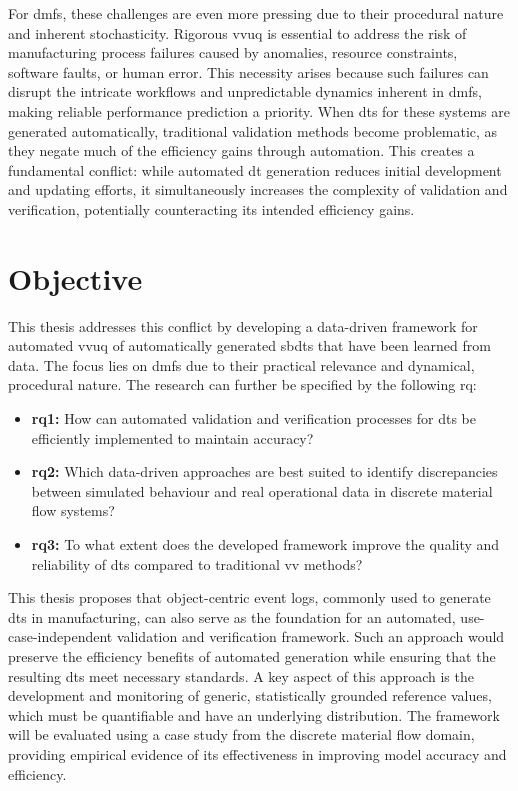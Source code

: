 For \gls{dmfs}, these challenges are even more pressing due to their procedural nature and inherent stochasticity. Rigorous \gls{vvuq} is essential to address the risk of manufacturing process failures caused by anomalies, resource constraints, software faults, or human error. This necessity arises because such failures can disrupt the intricate workflows and unpredictable dynamics inherent in \gls{dmfs}, making reliable performance prediction a priority. When \gls{dt}s for these systems are generated automatically, traditional validation methods become problematic, as they negate much of the efficiency gains through automation. This creates a fundamental conflict: while automated \gls{dt} generation reduces initial development and updating efforts, it simultaneously increases the complexity of validation and verification, potentially counteracting its intended efficiency gains.

\section{Objective}

This thesis addresses this conflict by developing a data-driven framework for automated \gls{vvuq} of automatically generated \gls{sbdt}s that have been learned from data. The focus lies on \gls{dmfs} due to their practical relevance and dynamical, procedural nature. The research can further be specified by the following \gls{rq}:

\begin{itemize}
  \label{par:rq1}
  \item \textbf{\gls{rq}1:} How can automated validation and verification processes for \gls{dt}s be efficiently implemented to maintain accuracy?
        \label{par:rq2}
  \item \textbf{\gls{rq}2:} Which data-driven approaches are best suited to identify discrepancies between simulated behaviour and real operational data in discrete material flow systems?
        \label{par:rq3}
  \item \textbf{\gls{rq}3:} To what extent does the developed framework improve the quality and reliability of \gls{dt}s compared to traditional \gls{vv} methods?
\end{itemize}

This thesis proposes that object-centric event logs, commonly used to generate \gls{dt}s in manufacturing, can also serve as the foundation for an automated, use-case-independent validation and verification framework. Such an approach would preserve the efficiency benefits of automated generation while ensuring that the resulting \gls{dt}s meet necessary standards. A key aspect of this approach is the development and monitoring of generic, statistically grounded reference values, which must be quantifiable and have an underlying distribution. The framework will be evaluated using a case study from the discrete material flow domain, providing empirical evidence of its effectiveness in improving model accuracy and efficiency.

